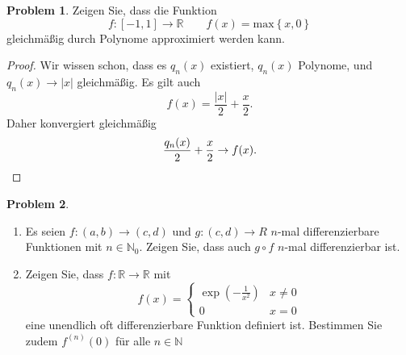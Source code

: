 \documentclass[prb,12pt]{revtex4-2}
\theoremstyle{definition}
\newtheorem{Problem}{Problem}
\theoremstyle{definition}
\newcommand{\N}{\mathbb{N}}
\newcommand{\R}{\mathbb{R}}
\begin{document}
\begin{Problem}
	Zeigen Sie, dass die Funktion
	\[f:[-1,1]\to\R\qquad f(x)=\text{max}\left\{ x,0 \right\} \]
	gleichmäßig durch Polynome approximiert werden kann.
\end{Problem}
\begin{proof}
	Wir wissen schon, dass es $q_n(x)$ existiert, $q_n(x)$ Polynome, und $q_n(x)\to |x|$ gleichmäßig. Es gilt auch
	\[
	f(x)=\frac{|x|}{2}+\frac{x}{2}
	.\] 
	Daher konvergiert gleichmäßig
	\[
		\frac{q_n(x)}{2}+\frac{x}{2}\to f(x)
	.\qedhere\] 
\end{proof}
\begin{Problem}
\begin{enumerate}[label=\roman*)]
	\item  Es seien $f : (a, b) \to (c, d)$ und $g : (c, d) \to  R$  $n$-mal differenzierbare Funktionen mit $n \in \N_0$. Zeigen Sie, dass auch $g \circ f$ $n$-mal differenzierbar ist.  
	\item Zeigen Sie, dass $f : \R \to \R$ mit
		\[
		f(x)=\begin{cases}
			\exp\left( -\frac{1}{x^2} \right) & x\neq 0\\
			0 & x = 0 
		\end{cases}
		\]
		eine unendlich oft differenzierbare Funktion definiert ist. Bestimmen Sie zudem $f^{(n)}(0)$ für alle $n\in \N$
\end{enumerate}	
\end{Problem}
\end{document}
